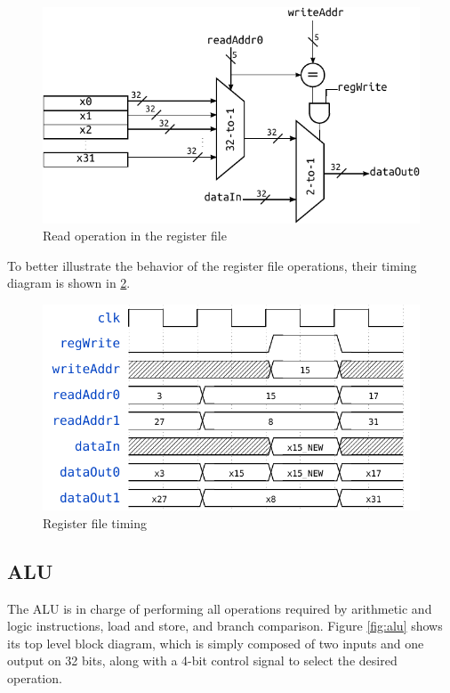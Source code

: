 \documentclass[a4paper]{article}
\begin{document}
\begin{figure}[hbtp]
    \centering
    \includegraphics{../register_file/ref/schematic/register_file_deep.pdf}
    \caption{Read operation in the register file}
    \label{fig:rf_read}
\end{figure}

To better illustrate the behavior of the register file operations, their timing diagram is shown in \ref{fig:rf_timing}.

\begin{figure}[hbtp]
    \centering
    \includegraphics[scale=.8]{../register_file/ref/timing/rf_timing.pdf}
    \caption{Register file timing}
    \label{fig:rf_timing}
\end{figure}

\subsection{ALU}
The ALU is in charge of performing all operations required by arithmetic and logic instructions, load and store, and branch comparison. Figure \ref{fig:alu} shows its top level block diagram, which is simply composed of two inputs and one output on 32 bits, along with a 4-bit control signal to select the desired operation.
\end{document}
